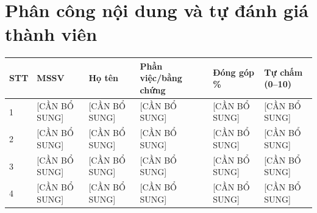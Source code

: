\chapter*{Phân công nội dung và tự đánh giá thành viên}
\scriptsize
\begin{longtable}{|p{}|p{}|p{}|p{}|p{}|p{}|}\hline
\textbf{STT}&\textbf{MSSV}&\textbf{Họ tên}&\textbf{Phần việc/bằng chứng}&\textbf{Đóng góp \%}&\textbf{Tự chấm (0--10)}\\\hline
1&[CẦN BỔ SUNG]&[CẦN BỔ SUNG]&[CẦN BỔ SUNG]&[CẦN BỔ SUNG]&[CẦN BỔ SUNG]\\\hline
2&[CẦN BỔ SUNG]&[CẦN BỔ SUNG]&[CẦN BỔ SUNG]&[CẦN BỔ SUNG]&[CẦN BỔ SUNG]\\\hline
3&[CẦN BỔ SUNG]&[CẦN BỔ SUNG]&[CẦN BỔ SUNG]&[CẦN BỔ SUNG]&[CẦN BỔ SUNG]\\\hline
4&[CẦN BỔ SUNG]&[CẦN BỔ SUNG]&[CẦN BỔ SUNG]&[CẦN BỔ SUNG]&[CẦN BỔ SUNG]\\\hline
\end{longtable}
\normalsize
